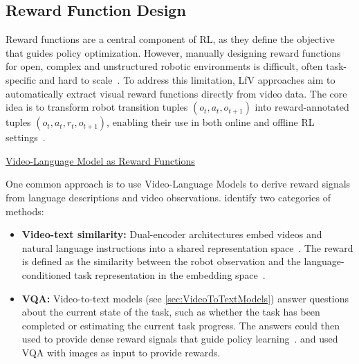 





\subsection{Reward Function Design}
\label{sec:RewardFunctions}

Reward functions are a central component of \ac{RL}, as they define the objective that guides policy optimization. However, manually designing reward functions for open, complex and unstructured robotic environments is difficult, often task-specific and hard to scale~\cite{McCarthy_2025}. To address this limitation, \ac{LfV} approaches aim to automatically extract visual reward functions directly from video data. The core idea is to transform robot transition tuples $(o_t, a_t, o_{t+1})$ into reward-annotated tuples $(o_t, a_t, r_t, o_{t+1})$, enabling their use in both online and offline \ac{RL} settings~\cite{McCarthy_2025}.


\underline{Video-Language Model as Reward Functions}


One common approach is to use Video-Language Models to derive reward signals from language descriptions and video observations. \textcite{McCarthy_2025} identify two categories of methods:
\begin{itemize}
    \item \textbf{Video-text similarity:} Dual-encoder architectures embed videos and natural language instructions into a shared representation space~\cite{Xu2021VideoCLIPCP, Zhao2024VideoPrismAF}. The reward is defined as the similarity between the robot observation and the language-conditioned task representation in the embedding space~\cite{Sontakke2023RoboCLIPOD, Fan2022MineDojoBO, Ding2023ReinforcementLF}.
    
    \item \textbf{\acf{VQA}:} Video-to-text models (see \autoref{sec:VideoToTextModels}) answer questions about the current state of the task, such as whether the task has been completed or estimating the current task progress. The answers could then used to provide dense reward signals that guide policy learning~\cite{McCarthy_2025}. \textcite{Du2023VideoLP} and \textcite{Yang2023RobotFM} used \ac{VQA} with images as input to provide rewards.
\end{itemize}



